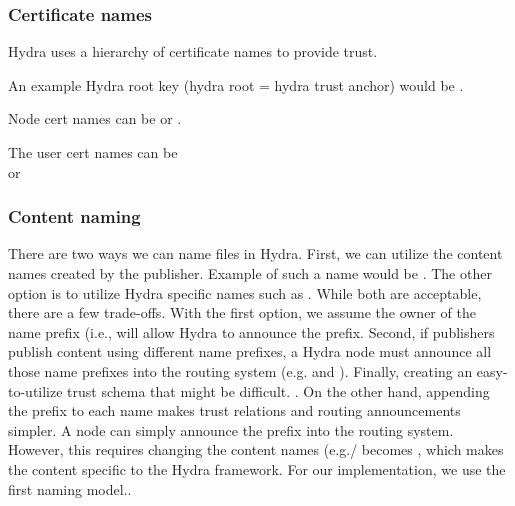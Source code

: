 \subsubsection{Certificate names}
Hydra uses a hierarchy of certificate names to provide trust. 

An example Hydra root key (hydra root = hydra trust anchor) would be .

Node cert names can be  or 
.

The user cert names can be  \\
 or 
\\



\subsubsection{Content naming}
There are two ways we can name files in Hydra. First, we can utilize the content names created by the publisher. Example of such a name would be . The other option is to utilize Hydra specific names such as . While both are acceptable, there are a few trade-offs. With the first option, we assume the owner of the name prefix (i.e.,  will allow Hydra to announce the prefix. Second, if publishers publish content using different name prefixes, a Hydra node must announce all those name prefixes into the routing system (e.g.  and ). Finally, creating an easy-to-utilize trust schema that might be difficult. . On the other hand, appending the  prefix to each name makes trust relations and routing announcements simpler. A node can simply announce the  prefix into the routing system. However, this requires changing the content names (e.g./  becomes , which makes the content specific to the Hydra framework. For our implementation, we use the first naming model..
